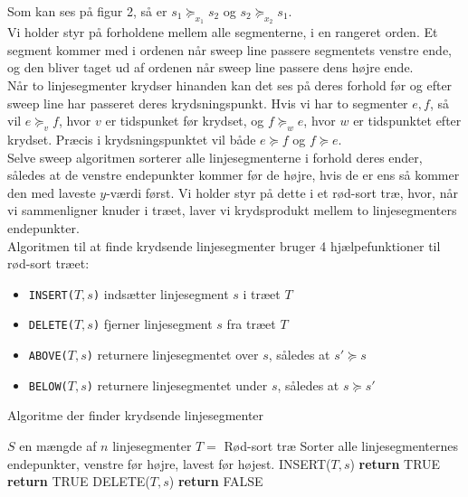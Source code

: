 Som kan ses på figur 2, så er $s_1 \succeq_{x_1} s_2$ og $s_2 \succeq_{x_2} s_1$.\\
Vi holder styr på forholdene mellem alle segmenterne, i en rangeret orden. Et segment kommer med i ordenen når sweep line passere segmentets venstre ende, og den bliver taget ud af ordenen når sweep line passere dens højre ende.\\

Når to linjesegmenter krydser hinanden kan det ses på deres forhold før og efter sweep line har passeret deres krydsningspunkt. Hvis vi har to segmenter $e, f$, så vil $e \succeq_v f$, hvor $v$ er tidspunket før krydset, og $f \succeq_w e$, hvor $w$ er tidspunktet efter krydset. Præcis i krydsningspunktet vil både $e \succeq f$ og $f \succeq e$.\\

Selve sweep algoritmen sorterer alle linjesegmenterne i forhold deres ender, således at de venstre endepunkter kommer før de højre, hvis de er ens så kommer den med laveste $y$-værdi først. Vi holder styr på dette i et rød-sort træ, hvor, når vi sammenligner knuder i træet, laver vi krydsprodukt mellem to linjesegmenters endepunkter.\\

Algoritmen til at finde krydsende linjesegmenter bruger 4 hjælpefunktioner til rød-sort træet:
\begin{itemize}
\item \texttt{INSERT($T,s$)} indsætter linjesegment $s$ i træet $T$
\item \texttt{DELETE($T,s$)} fjerner linjesegment $s$ fra træet $T$
\item \texttt{ABOVE($T,s$)} returnere linjesegmentet over $s$, således at $s' \succeq s$
\item \texttt{BELOW($T,s$)} returnere linjesegmentet under $s$, således at $s \succeq s'$
\end{itemize}

\begin{algorithm}[H]
  \caption{Algoritme der finder krydsende linjesegmenter}
  \begin{algorithmic}[1]
    \State $S$ en mængde af $n$ linjesegmenter
    \State $T =$ Rød-sort træ
    \State Sorter alle linjesegmenternes endepunkter, venstre før højre, lavest før højest.
    \State INSERT($T,s$)
    \State \textbf{return} TRUE 
    \EndIf
    \EndIf
    \State \textbf{return} TRUE
    \EndIf
    \State DELETE($T,s$)
    \EndIf
    \EndFor
    \State \textbf{return} FALSE
    \EndFunction
  \end{algorithmic}
\end{algorithm}
